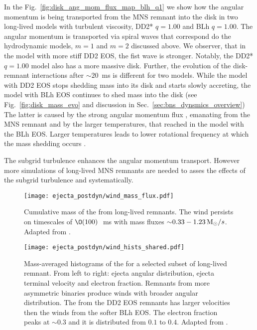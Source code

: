 In the Fig.~\ref{fig:disk_ang_mom_flux_map_blh_q1} we show how the 
angular momentum is being transported from the \ac{MNS} remnant into the disk
in two long-lived models with turbulent viscosity, DD2* $q=1.00$ and BLh $q=1.00$.
The angular momentum is transported via spiral waves that correspond do the 
hydrodynamic models, $m=1$ and $m=2$ discussed above.
We observer, that in the model with more stiff DD2 \ac{EOS},
the fist wave is stronger. Notably, the DD2* $q=1.00$ model 
also has a more massive disk.
Further, the evolution of the disk-remnant interactions 
after $\sim20$~ms \pmerg{} is different for two models. 
While the model with DD2 \ac{EOS} stops shedding mass into 
its disk and starts slowly accreting, the model with BLh \ac{EOS} continues to shed mass into the disk
(see Fig.~\ref{fig:disk_mass_evo} and discussion in
Sec.~\ref{sec:bns_dynsmics_overview})
The latter is caused by the strong angular momentum flux , emanating 
from the \ac{MNS} remnant and by the larger temperatures, 
that reached in the model with the BLh \ac{EOS}.
Larger temperatures leads to lower rotational frequency 
at which the mass shedding occurs \citep{Kaplan:2013wra}. 

The subgrid turbulence enhances the angular momentum transport. However more simulations of long-lived 
\ac{MNS} remnants are needed to asses the effects of the 
subgrid turbulence and \mr{} systematically. 

\begin{figure}[t]
    \centering 
    \texttt{[image: ejecta\_postdyn/wind\_mass\_flux.pdf]}
    \caption{Cumulative mass of the \swind{} from long-lived
        remnants. The wind persists on timescales of $\O(100)\,$~ms with
        mass fluxes ${\sim}0.33-1.23\,{\text{M}_{\odot}}/s$.
        Adapted from \citet{Nedora:2020pak}.
    }
    \label{fig:mej:bern}
\end{figure}

\begin{figure*}[t]
    \centering 
    \texttt{[image: ejecta\_postdyn/wind\_hists\_shared.pdf]}
    \caption{Mass-averaged histograms of the \swind{} for a selected
        subset of long-lived remnant. From left to right: ejecta angular
        distribution, ejecta terminal velocity and electron
        fraction. Remnants from more asymmetric binaries produce winds
        with broader angular distribution.
        The \swind{} from the DD2 EOS remnants has larger velocities
        then the winds from the softer BLh EOS. The electron fraction
        peaks at ${\sim}0.3$ and it is distributed from $0.1$ to $0.4$.
        Adapted from \citet{Nedora:2020pak}.
    }
    \label{fig:ejecta:bern:hist}
\end{figure*}

